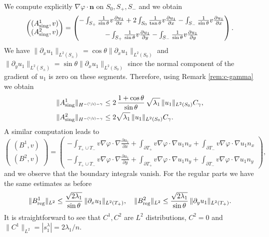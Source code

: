 \documentclass[JEP,XML,SOM,Unicode,ThmDefs,NoFloatCountersInSection,published]{cedram}
\newcommand{\Psfrac}[2]{(\sfrac{#1}{#2})}
\theoremstyle{plain}
\theoremstyle{definition}
\newcommand{\bo}[1]{{\boldsymbol#1}}
\newcommand{\reg}{\textup{reg}}
\newcommand{\sing}{\textup{sing}}
\newcommand{\lb}{\lambda}
\begin{document}
We compute explicitly $\nabla \varphi \cdot \bo n$ on $S_0,S_+,S_-$ and we obtain
\[
\begin{pmatrix} (A^1_{\sing},v)\\ (A^2_{\sing},v) \end{pmatrix}
=\begin{pmatrix}-\int_{S_+}\frac{1}{\sin\theta} v \frac{\partial u_1}{\partial x}
+2\int_{S_0}\frac{1}{\tan \theta} v \frac{\partial u_1}{\partial x}
-\int_{S_-}\frac{1}{\sin\theta} v \frac{\partial u_1}{\partial x} \\[8pt]
-\int_{S_+}\frac{1}{\sin\theta} v \frac{\partial u_1}{\partial y}
-\int_{S_-}\frac{1}{\sin\theta} v \frac{\partial u_1}{\partial y}
\end{pmatrix}.
\]
We have $\|\partial_x u_1\|_{L^2(S_\pm)} = \cos \theta \|\partial_x u_1\|_{L^2(S_0)}$ and $\|\partial_y u_1\|_{L^2(S_\pm)} = \sin \theta \|\partial_x u_1\|_{L^2(S_0)}$ since the normal component of the gradient of $u_1$ is zero on these segments. Therefore, using Remark \ref{rem:c-gamma} we obtain
\begin{align*}
\|A^1_{\sing}\|_{H^{-\Psfrac 12-\gamma}} &\le 2\, \frac{1+ \cos \theta}{ \sin \theta}\, \sqrt{ \lb_1 }\, \|u_1\|_{L^2(S_0)}C_\gamma, \\
\|A^2_{\sing}\|_{H^{-\Psfrac 12-\gamma}} &\le 2 \sqrt{ \lb_1 }\, \|u_1 \|_{L^2(S_0)}C_\gamma.
\end{align*}
A similar computation leads to
\[
\begin{pmatrix} (B^1,v)\\ (B^2,v) \end{pmatrix} = \begin{pmatrix} - \int_{T_+\cup T_-} v \nabla \varphi \cdot \nabla \frac{\partial u_1 }{\partial x} + \int_{\partial T_+} v \nabla \varphi \cdot \nabla u_1 n_x +\int_{\partial T_-} v \nabla \varphi \cdot \nabla u_1 n_x\\[5pt]
- \int_{T_+\cup T_-} v \nabla \varphi \cdot \nabla \frac{\partial u_1 }{\partial y} +\int_{\partial T_+} v \nabla \varphi \cdot \nabla u_1 n_y +\int_{\partial T_-} v \nabla \varphi \cdot \nabla u_1 n_y \end{pmatrix},
\]
and we observe that the boundary integrals vanish. For the regular parts we have the same estimates as before
\[
\|B^1_{\reg}\|_{L^2} \leq \frac{\sqrt{2\lambda_1}}{\sin \theta}\, \|\partial_x u_1\|_{L^2(T_+)},\quad \|B^2_{\reg}\|_{L^2} \leq \frac{\sqrt{2\lambda_1}}{\sin \theta}\,\|\partial_y u_1\|_{L^2(T_+)}.
\]
It is straightforward to see that $C^1,C^2$ are $L^2$ distributions, $C^2 = 0$ and $\|C^1\|_{L^2} = |s_1^\lambda| = 2\lambda_1/n$.
\end{document}
